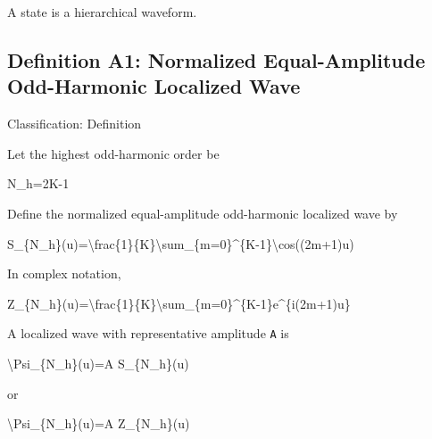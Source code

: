 \documentclass[
  a4paper]{article}
\newenvironment{Shaded}{}{}
\newcommand{\NormalTok}[1]{#1}
\begin{document}
A state is a hierarchical waveform.

\subsection{Definition A1: Normalized Equal-Amplitude Odd-Harmonic
Localized
Wave}\label{definition-a1-normalized-equal-amplitude-odd-harmonic-localized-wave}

Classification: Definition

Let the highest odd-harmonic order be

\begin{Shaded}
\begin{Highlighting}[]
\NormalTok{N\_h=2K{-}1}
\end{Highlighting}
\end{Shaded}

Define the normalized equal-amplitude odd-harmonic localized wave by

\begin{Shaded}
\begin{Highlighting}[]
\NormalTok{S\_\{N\_h\}(u)=\textbackslash{}frac\{1\}\{K\}\textbackslash{}sum\_\{m=0\}\^{}\{K{-}1\}\textbackslash{}cos((2m+1)u)}
\end{Highlighting}
\end{Shaded}

In complex notation,

\begin{Shaded}
\begin{Highlighting}[]
\NormalTok{Z\_\{N\_h\}(u)=\textbackslash{}frac\{1\}\{K\}\textbackslash{}sum\_\{m=0\}\^{}\{K{-}1\}e\^{}\{i(2m+1)u\}}
\end{Highlighting}
\end{Shaded}

A localized wave with representative amplitude \texttt{A} is

\begin{Shaded}
\begin{Highlighting}[]
\NormalTok{\textbackslash{}Psi\_\{N\_h\}(u)=A S\_\{N\_h\}(u)}
\end{Highlighting}
\end{Shaded}

or

\begin{Shaded}
\begin{Highlighting}[]
\NormalTok{\textbackslash{}Psi\_\{N\_h\}(u)=A Z\_\{N\_h\}(u)}
\end{Highlighting}
\end{Shaded}
\end{document}
